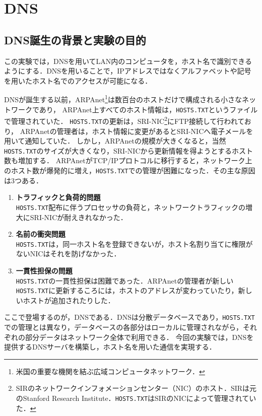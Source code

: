 \chapter{DNS}
\section{DNS誕生の背景と実験の目的}
この実験では，DNSを用いてLAN内のコンピュータを，ホスト名で識別できるようにする．DNSを用いることで，IPアドレスではなくアルファベットや記号を用いたホスト名でのアクセスが可能になる．\par
DNSが誕生する以前，ARPAnet\footnote{米国の重要な機関を結ぶ広域コンピュータネットワーク\cite[p.1]{DNSBIND}．}は数百台のホストだけで構成される小さなネットワークであり，
ARPAnet上すべてのホスト情報は，\texttt{HOSTS.TXT}というファイルで管理されていた．
\texttt{HOSTS.TXT}の更新は，SRI-NIC\footnote{SIRのネットワークインフォメーションセンター（NIC）のホスト．SIRは元のStanford Research Institute．\texttt{HOSTS.TXT}はSIRのNICによって管理されていた．}にFTP接続して行われており，
ARPAnetの管理者は，ホスト情報に変更があるとSRI-NICへ電子メールを用いて通知していた．
しかし，ARPAnetの規模が大きくなると，当然\texttt{HOSTS.TXT}のサイズが大きくなり，SRI-NICから更新情報を得ようとするホスト数も増加する\cite[p.3]{DNSBIND}．
ARPAnetがTCP/IPプロトコルに移行すると，ネットワーク上のホスト数が爆発的に増え，\texttt{HOSTS.TXT}での管理が困難になった．その主な原因は3つある．
\begin{enumerate}
      \item \textbf{トラフィックと負荷的問題}\\
            \texttt{HOSTS.TXT}配布に伴うプロセッサの負荷と，ネットワークトラフィックの増大にSRI-NICが耐えきれなかった．
      \item \textbf{名前の衝突問題}\\
            \texttt{HOSTS.TXT}は，同一ホスト名を登録できないが，ホスト名割り当てに権限がないNICはそれを防げなかった．
      \item \textbf{一貫性担保の問題}\\
            \texttt{HOSTS.TXT}の一貫性担保は困難であった．ARPAnetの管理者が新しい\texttt{HOSTS.TXT}に更新するころには，ホストのアドレスが変わっていたり，新しいホストが追加されたりした．
\end{enumerate}
\hfill\cite[p.4]{DNSBIND}\par
ここで登場するのが，DNSである．DNSは分散データベースであり，\texttt{HOSTS.TXT}での管理とは異なり，データベースの各部分はローカルに管理されながら，それぞれの部分データはネットワーク全体で利用できる\cite[p.5]{DNSBIND}．
今回の実験では，DNSを提供するDNSサーバを構築し，ホスト名を用いた通信を実現する．

